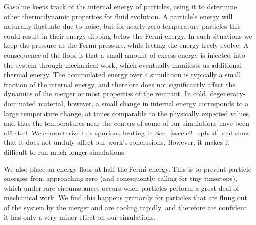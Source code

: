 Gasoline keeps track of the internal energy of particles, using it to determine other thermodynamic properties for fluid evolution.  A particle's energy will naturally fluctuate due to noise, but for nearly zero-temperature particles this could result in their energy dipping below the Fermi energy.  In such situations we keep the pressure at the Fermi pressure, while letting the energy freely evolve.  A consequence of the floor is that a small amount of excess energy is injected into the system through mechanical work, which eventually manifests as additional thermal energy.  The accumulated energy over a simulation is typically a small fraction of the internal energy, and therefore does not significantly affect the dynamics of the merger or most properties of the remnant.  In cold, degeneracy-dominated material, however, a small change in internal energy corresponds to a large temperature change, at times comparable to the physically expected values, and thus the temperatures near the centers of some of our simulations have been affected.  We characterize this spurious heating in Sec.~\ref{ssec:c2_spheat} and show that it does not unduly affect our work's conclusions.  However, it makes it difficult to run much longer simulations.

We also place an energy floor at half the Fermi energy.  This is to prevent particle energies from approaching zero (and consequently calling for tiny timesteps), which under rare circumstances occurs when particles perform a great deal of mechanical work.  We find this happens primarily for particles that are flung out of the system by the merger and are cooling rapidly, and therefore are confident it has only a very minor effect on our simulations.




